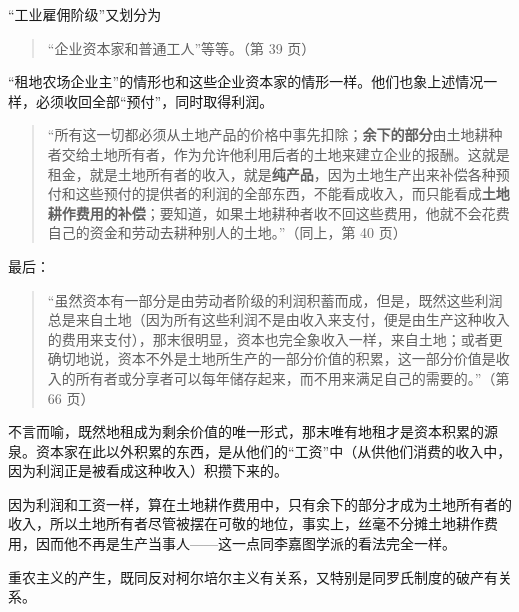 “工业雇佣阶级”又划分为

\begin{quote}“企业资本家和普通工人”等等。（第 39 页）\end{quote}

“租地农场企业主”的情形也和这些企业资本家的情形一样。他们也象上述情况一样，必须收回全部“预付”，同时取得利润。

\begin{quote}“所有这一切都必须从土地产品的价格中事先扣除；\textbf{余下的部分}由土地耕种者交给土地所有者，作为允许他利用后者的土地来建立企业的报酬。这就是租金，就是土地所有者的收入，就是\textbf{纯产品}，因为土地生产出来补偿各种预付和这些预付的提供者的利润的全部东西，不能看成收入，而只能看成\textbf{土地耕作费用的补偿}；要知道，如果土地耕种者收不回这些费用，他就不会花费自己的资金和劳动去耕种别人的土地。”（同上，第 40 页）\end{quote}

最后：

\begin{quote}“虽然资本有一部分是由劳动者阶级的利润积蓄而成，但是，既然这些利润总是来自土地（因为所有这些利润不是由收入来支付，便是由生产这种收入的费用来支付），那末很明显，资本也完全象收入一样，来自土地；或者更确切地说，资本不外是土地所生产的一部分价值的积累，这一部分价值是收入的所有者或分享者可以每年储存起来，而不用来满足自己的需要的。”（第 66 页）\end{quote}

不言而喻，既然地租成为剩余价值的唯一形式，那末唯有地租才是资本积累的源泉。资本家在此以外积累的东西，是从他们的“工资”中（从供他们消费的收入中，因为利润正是被看成这种收入）积攒下来的。

因为利润和工资一样，算在土地耕作费用中，只有余下的部分才成为土地所有者的收入，所以土地所有者尽管被摆在可敬的地位，事实上，丝毫不分摊土地耕作费用，因而他不再是生产当事人——这一点同李嘉图学派的看法完全一样。

重农主义的产生，既同反对柯尔培尔主义有关系，又特别是同罗氏制度的破产有关系。

